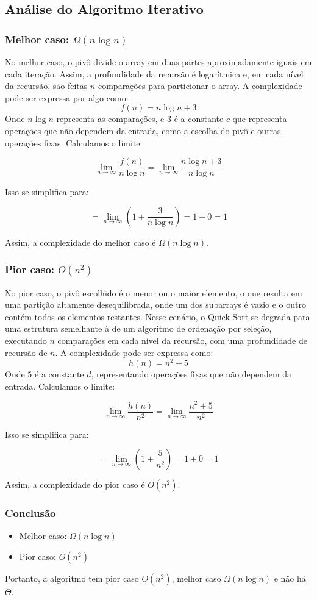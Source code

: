 \subsection{Análise do Algoritmo Iterativo}

\subsubsection{Melhor caso: \(\Omega(n \log n)\)}
No melhor caso, o pivô divide o array em duas partes aproximadamente iguais em cada iteração. Assim, a profundidade da recursão é logarítmica e, em cada nível da recursão, são feitas \(n\) comparações para particionar o array. A complexidade pode ser expressa por algo como:
\[
f(n) = n \log n + 3
\]
Onde \(n \log n\) representa as comparações, e \(3\) é a constante \(c\) que representa operações que não dependem da entrada, como a escolha do pivô e outras operações fixas. Calculamos o limite:

\[
\lim_{n \to \infty} \frac{f(n)}{n \log n} = \lim_{n \to \infty} \frac{n \log n + 3}{n \log n}
\]

Isso se simplifica para:

\[
= \lim_{n \to \infty} \left(1 + \frac{3}{n \log n}\right) = 1 + 0 = 1
\]

Assim, a complexidade do melhor caso é \(\Omega(n \log n)\).

\subsubsection{Pior caso: \(O(n^2)\)}
No pior caso, o pivô escolhido é o menor ou o maior elemento, o que resulta em uma partição altamente desequilibrada, onde um dos subarrays é vazio e o outro contém todos os elementos restantes. Nesse cenário, o Quick Sort se degrada para uma estrutura semelhante à de um algoritmo de ordenação por seleção, executando \(n\) comparações em cada nível da recursão, com uma profundidade de recursão de \(n\). A complexidade pode ser expressa como:
\[
h(n) = n^2 + 5
\]
Onde \(5\) é a constante \(d\), representando operações fixas que não dependem da entrada. Calculamos o limite:

\[
\lim_{n \to \infty} \frac{h(n)}{n^2} = \lim_{n \to \infty} \frac{n^2 + 5}{n^2}
\]

Isso se simplifica para:

\[
= \lim_{n \to \infty} \left(1 + \frac{5}{n^2}\right) = 1 + 0 = 1
\]

Assim, a complexidade do pior caso é \(O(n^2)\).

\subsubsection{Conclusão}
\begin{itemize}
  \item Melhor caso: \(\Omega(n \log n)\)
  \item Pior caso: \(O(n^2)\)
\end{itemize}

Portanto, a algoritmo tem pior caso \(O(n^2)\), melhor caso \(\Omega(n \log n)\) e não há $\Theta$.